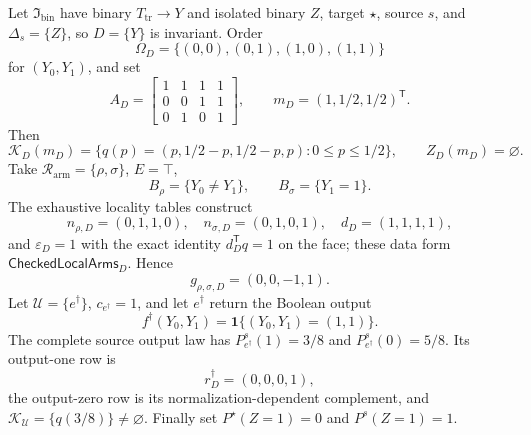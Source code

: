 Let \(\mathfrak I_{\mathrm{bin}}\) have binary \(T_{\mathrm{tr}}\to Y\) and isolated binary \(Z\), target \(\star\), source \(s\), and \(\Delta_s=\{Z\}\), so \(D=\{Y\}\) is invariant.  Order
\[
\Omega_D=\{(0,0),(0,1),(1,0),(1,1)\}
\]
for \((Y_0,Y_1)\), and set
\[
A_D=\begin{bmatrix}
1&1&1&1\\0&0&1&1\\0&1&0&1
\end{bmatrix},
\qquad m_D=(1,1/2,1/2)^{\mathsf T}.
\]
Then
\[
\mathcal K_D(m_D)=
\{q(p)=(p,1/2-p,1/2-p,p):0\leq p\leq1/2\},
\qquad Z_D(m_D)=\varnothing.
\]
Take \(\mathcal R_{\mathrm{arm}}=\{\rho,\sigma\}\), \(E=\top\),
\[
B_\rho=\{Y_0\ne Y_1\},
\qquad B_\sigma=\{Y_1=1\}.
\]
The exhaustive locality tables construct
\[
n_{\rho,D}=(0,1,1,0),\quad
n_{\sigma,D}=(0,1,0,1),\quad
d_D=(1,1,1,1),
\]
and \(\varepsilon_D=1\) with the exact identity \(d_D^{\mathsf T}q=1\) on the face; these data form \(\mathsf{CheckedLocalArms}_D\).  Hence
\[
g_{\rho,\sigma,D}=(0,0,-1,1).
\]
Let \(\mathcal U=\{e^\dagger\}\), \(c_{e^\dagger}=1\), and let \(e^\dagger\) return the Boolean output
\[
f^\dagger(Y_0,Y_1)=\mathbf 1\{(Y_0,Y_1)=(1,1)\}.
\]
The complete source output law has \(P_{e^\dagger}^s(1)=3/8\) and \(P_{e^\dagger}^s(0)=5/8\).  Its output-one row is
\[
r_D^\dagger=(0,0,0,1),
\]
the output-zero row is its normalization-dependent complement, and \(\mathcal K_{\mathcal U}=\{q(3/8)\}\ne\varnothing\).  Finally set \(P^\star(Z=1)=0\) and \(P^s(Z=1)=1\).